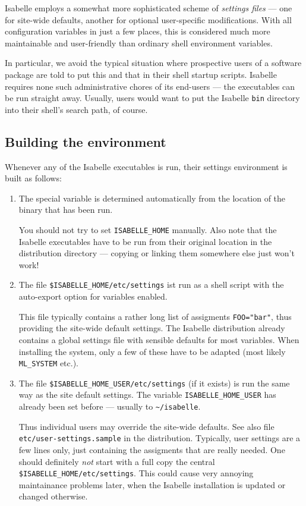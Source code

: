 Isabelle employs a somewhat more sophisticated scheme of
\emph{settings files} --- one for site-wide defaults, another for
optional user-specific modifications.  With all configuration
variables in just a few places, this is considered much more
maintainable and user-friendly than ordinary shell environment
variables.

In particular, we avoid the typical situation where prospective users
of a software package are told to put this and that in their shell
startup scripts. Isabelle requires none such administrative chores of
its end-users --- the executables can be run straight away. Usually,
users would want to put the Isabelle \texttt{bin} directory into their
shell's search path, of course.


\subsection{Building the environment}

Whenever any of the Isabelle executables is run, their settings
environment is built as follows:

\begin{enumerate}
\item The special variable  is determined
  automatically from the location of the binary that has been run.
  
  You should not try to set \texttt{ISABELLE_HOME} manually. Also note
  that the Isabelle executables have to be run from their original
  location in the distribution directory --- copying or linking them
  somewhere else just won't work!
  
\item The file \texttt{\$ISABELLE_HOME/etc/settings} ist run as a
  shell script with the auto-export option for variables enabled.
  
  This file typically contains a rather long list of assigments
  \texttt{FOO="bar"}, thus providing the site-wide default settings.
  The Isabelle distribution already contains a global settings file
  with sensible defaults for most variables. When installing the
  system, only a few of these have to be adapted (most likely
  \texttt{ML_SYSTEM} etc.).
  
\item The file \texttt{\$ISABELLE_HOME_USER/etc/settings} (if it
  exists) is run the same way as the site default settings. The
  variable \texttt{ISABELLE_HOME_USER} has already been set before ---
  usually to \texttt{\~\relax/isabelle}.
  
  Thus individual users may override the site-wide defaults. See also
  file \texttt{etc/user-settings.sample} in the distribution.
  Typically, user settings are a few lines only, just containing the
  assigments that are really needed.  One should definitely \emph{not}
  start with a full copy the central
  \texttt{\$ISABELLE_HOME/etc/settings}. This could cause very
  annoying maintainance problems later, when the Isabelle installation
  is updated or changed otherwise.

\end{enumerate}

